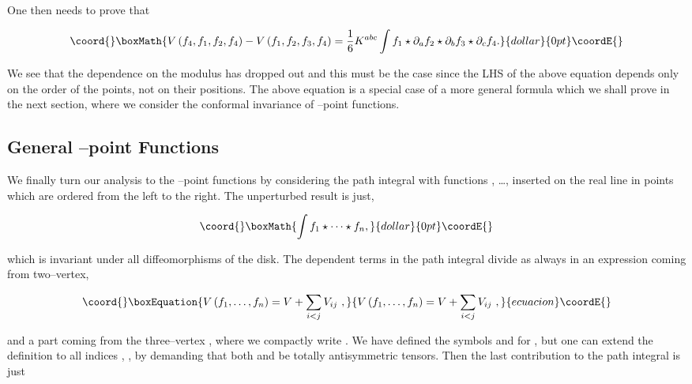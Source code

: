 \documentclass[a4paper,11pt]{article}
\begin{document}
\noindent
One then needs to prove that 

$$\coord{}\boxMath{
V\left( f_{4},f_{1},f_{2},f_{4}\right) -V\left(
f_{1},f_{2},f_{3},f_{4}\right) =\frac{1}{6}K^{abc}\int f_{1}\star \partial
_{a}f_{2}\star \partial _{b}f_{3}\star \partial _{c}f_{4}.
}{dollar}{0pt}\coordE{}$$

\noindent
We see that the dependence on the modulus \coordHE{} has dropped out and this must
be the case since the LHS of the above equation depends only on the order of
the points, not on their positions. The above equation is a special case of
a more general formula which we shall prove in the next section, where we
consider the conformal invariance of \coordHE{}--point functions.


\subsection{General \coordHE{}--point Functions}


We finally turn our analysis to the \coordHE{}--point functions by considering the 
path integral with \coordHE{} functions \coordHE{}, \dots, \coordHE{} inserted on the real 
line in points \coordHE{} which are ordered from 
the left to the right. The unperturbed result is just,

$$\coord{}\boxMath{
\int f_{1}\star \cdots \star f_{n},
}{dollar}{0pt}\coordE{}$$

\noindent
which is invariant under all diffeomorphisms of the disk. The \coordHE{} 
dependent terms in the path integral divide as always in an expression 
coming from two--vertex,

\begin{equation}\coord{}\boxEquation{
V\left( f_{1}, \dots, f_{n}\right) =V+\sum_{i<j}V_{ij}\ , \label{eq2000}
}{
V\left( f_{1}, \dots, f_{n}\right) =V+\sum_{i<j}V_{ij}\ , }{ecuacion}\coordE{}\end{equation}

\noindent
and a part coming from the three--vertex \coordHE{}, 
where we compactly write \coordHE{}.
We have defined the symbols \coordHE{} and \coordHE{} for \coordHE{},
but one can extend the definition to all indices \coordHE{}, \coordHE{}, \coordHE{} by demanding 
that both \coordHE{} and \coordHE{} be totally antisymmetric tensors.
Then the last contribution to the path integral is just
\end{document}
